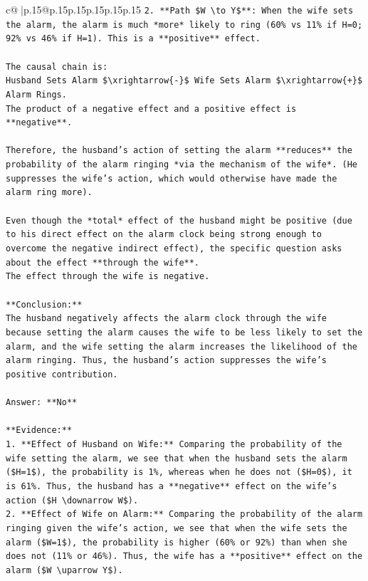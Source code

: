 \documentclass{article}
\begin{document}
{\begin{supertabular}{c@{$\;$}|p{.15\linewidth}@{}p{.15\linewidth}p{.15\linewidth}p{.15\linewidth}p{.15\linewidth}p{.15\linewidth}}
{{{\texttt{2.  **Path \$W \textbackslash{}to Y\$**: When the wife sets the alarm, the alarm is much *more* likely to ring (60\% vs 11\% if H=0; 92\% vs 46\% if H=1). This is a **positive** effect.} \\
\\ 
\texttt{The causal chain is:} \\
\texttt{Husband Sets Alarm \$\textbackslash{}xrightarrow\{{-}\}\$ Wife Sets Alarm \$\textbackslash{}xrightarrow\{+\}\$ Alarm Rings.} \\
\texttt{The product of a negative effect and a positive effect is **negative**.} \\
\\ 
\texttt{Therefore, the husband's action of setting the alarm **reduces** the probability of the alarm ringing *via the mechanism of the wife*. (He suppresses the wife's action, which would otherwise have made the alarm ring more).} \\
\\ 
\texttt{Even though the *total* effect of the husband might be positive (due to his direct effect on the alarm clock being strong enough to overcome the negative indirect effect), the specific question asks about the effect **through the wife**.} \\
\texttt{The effect through the wife is negative.} \\
\\ 
\texttt{**Conclusion:**} \\
\texttt{The husband negatively affects the alarm clock through the wife because setting the alarm causes the wife to be less likely to set the alarm, and the wife setting the alarm increases the likelihood of the alarm ringing. Thus, the husband's action suppresses the wife's positive contribution.} \\
\\ 
\texttt{Answer: **No**} \\
\\ 
\texttt{**Evidence:**} \\
\texttt{1.  **Effect of Husband on Wife:** Comparing the probability of the wife setting the alarm, we see that when the husband sets the alarm (\$H=1\$), the probability is 1\%, whereas when he does not (\$H=0\$), it is 61\%. Thus, the husband has a **negative** effect on the wife's action (\$H \textbackslash{}downarrow W\$).} \\
\texttt{2.  **Effect of Wife on Alarm:** Comparing the probability of the alarm ringing given the wife's action, we see that when the wife sets the alarm (\$W=1\$), the probability is higher (60\% or 92\%) than when she does not (11\% or 46\%). Thus, the wife has a **positive** effect on the alarm (\$W \textbackslash{}uparrow Y\$).} \\
}}}
\end{supertabular}}
\end{document}
